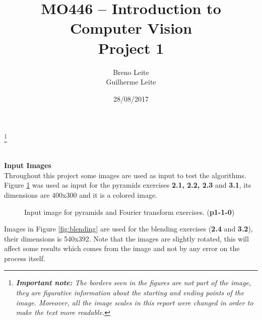 \documentclass[12pt,a4paper]{article}
\title{MO446 -- Introduction to Computer Vision  \\ Project 1}
\author{Breno Leite  \\ Guilherme Leite}
\date{28/08/2017}
\newcommand\blfootnote[1]{%
	\begingroup
	\renewcommand\thefootnote{}\footnote{#1}%
	\addtocounter{footnote}{-1}%
	\endgroup
}
\begin{document}
\maketitle
\blfootnote{\textit{\textbf{Important note:} The borders seen in the figures are not part of the image, they are figurative information about the starting and ending points of the image. Moreover, all the image scales in this report were changed in order to make the text more readable.}} \\


\textbf{\LARGE Input Images}\\

Throughout this project some images are used as input to test the algorithms. Figure \ref{fig:p1-1-0} was used as input for the pyramids exercises \textbf{2.1, 2.2, 2.3} and \textbf{3.1}, its dimensions are 400x300 and it is a colored image. \\

\begin{figure}[!h]
	\centering
	{%
		\setlength{\fboxsep}{1pt}%
		\setlength{\fboxrule}{1pt}%
	}%
	\caption{Input image for pyramids and Fourier transform exercises. (\textbf{p1-1-0})}
	\label{fig:p1-1-0}
\end{figure}

\newpage

Images in Figure \ref{fig:blending} are used for the blending exercises (\textbf{2.4} and \textbf{3.2}), their dimensions is 540x392. Note that the images are slightly rotated, this will affect some results which comes from the image and not by any error on the process itself.\\
\end{document}
